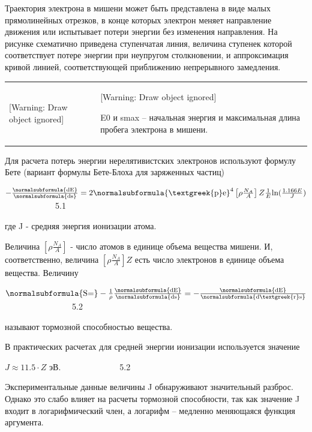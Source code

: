 \documentclass[a4paper,14pt, openany, twoside, draft]{extbook} %
\begin{document}
Траектория электрона в мишени может быть представлена в виде малых прямолинейных отрезков, в конце которых электрон меняет направление движения или испытывает потери энергии без изменения направления. На рисунке схематично приведена ступенчатая линия, величина ступенек которой соответствует потере энергии при неупругом столкновении, и аппроксимация кривой линией, соответствующей приближению непрерывного замедления.

\begin{flushleft}
\tablefirsthead{}
\tablehead{}
\tabletail{}
\tablelasttail{}
\begin{supertabular}{m{7.4290004cm}m{8.940001cm}}
{ [Warning: Draw object ignored]} &
{ [Warning: Draw object ignored]}

{ E0 и smax – начальная энергия и максимальная длина пробега электрона в мишени. }\\
\end{supertabular}
\end{flushleft}
Для расчета потерь энергии нерелятивистских электронов используют формулу Бете (вариант формулы Бете-Блоха для заряженных частиц)

 $-\frac{\normalsubformula{\text{dE}}}{\normalsubformula{\text{ds}}}=2\normalsubformula{\text{\textgreek{p}e}}^4\left[\rho \frac{N_A} A\right]Z\frac 1 E\text{ln}(\frac{1.166E} J)$ \ \ \ \ \ \ \ \ \ \ \ \ 5.1

где J - средняя энергия ионизации атома.

Величина  $\left[\rho \frac{N_A} A\right]$ - число атомов в единице объема вещества мишени. И, соответственно, величина  $\left[\rho \frac{N_A} A\right]Z$ есть число электронов в единице объема вещества. Величину

 $\normalsubformula{\text{S=}}-\frac 1{\rho }\frac{\normalsubformula{\text{dE}}}{\normalsubformula{\text{ds}}}=-\frac{\normalsubformula{\text{dE}}}{\normalsubformula{\text{d\textgreek{r}s}}}$ \ \ \ \ \ \ \ \ \ \ \ \ \ \ \ \ 5.2

называют тормозной способностью вещества.

В практических расчетах для средней энергии ионизации используется значение

 $J\approx 11.5\cdot Z$ эВ.\ \ \ \ \ \ \ \ \ \ \ \ \ \ 5.2

Экспериментальные данные величины J обнаруживают значительный разброс. Однако это слабо влияет на расчеты тормозной способности, так как значение J входит в логарифмический член, а логарифм – медленно меняющаяся функция аргумента.
\end{document}
